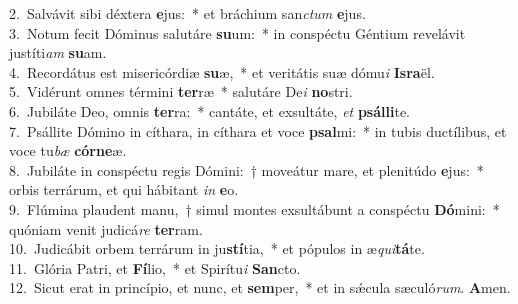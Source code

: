 {2.~}Salvávit sibi déxtera \textbf{e}jus:~* et bráchium san\textit{ctum} \textbf{e}jus.\\
{3.~}Notum fecit Dóminus salutáre \textbf{su}um:~* in conspéctu Géntium revelávit justíti\textit{am} \textbf{su}am.\\
{4.~}Recordátus est misericórdiæ \textbf{su}æ,~* et veritátis suæ dómu\textit{i} \textbf{Is}\textbf{ra}ël.\\
{5.~}Vidérunt omnes términi \textbf{ter}ræ~* salutáre De\textit{i} \textbf{no}stri.\\
{6.~}Jubiláte Deo, omnis \textbf{ter}ra:~* cantáte, et exsultáte, \textit{et} \textbf{psál}\textbf{li}te.\\
{7.~}Psállite Dómino in cíthara, in cíthara et voce \textbf{psal}mi:~* in tubis ductílibus, et voce tu\textit{bæ} \textbf{cór}\textbf{ne}æ.\\
{8.~}Jubiláte in conspéctu regis Dómini:~† moveátur mare, et plenitúdo \textbf{e}jus:~* orbis terrárum, et qui hábitant \textit{in} \textbf{e}o.\\
{9.~}Flúmina plaudent manu,~† simul montes exsultábunt a conspéctu \textbf{Dó}mini:~* quóniam venit judicá\textit{re} \textbf{ter}ram.\\
{10.~}Judicábit orbem terrárum in ju\textbf{stí}tia,~* et pópulos in æ\textit{qui}\textbf{tá}te.\\
{11.~}Glória Patri, et \textbf{Fí}lio,~* et Spirítu\textit{i} \textbf{San}cto.\\
{12.~}Sicut erat in princípio, et nunc, et \textbf{sem}per,~* et in sǽcula sæculó\textit{rum}. \textbf{A}men.\\
